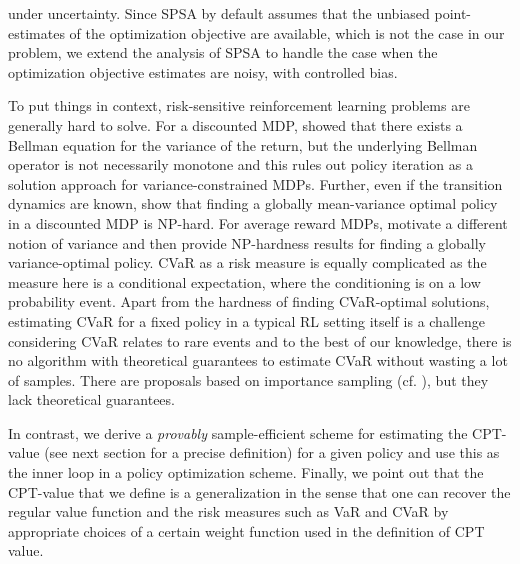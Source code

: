 under uncertainty.
Since SPSA by default assumes that the unbiased point-estimates of the optimization objective are available, which
is not the case in our problem, we extend the analysis of SPSA to handle the case when the optimization objective estimates are noisy, with controlled bias.
%
%

To put things in context, risk-sensitive reinforcement learning problems are generally hard to solve. 
For a discounted MDP, \cite{Sobel82VD} showed that there exists a Bellman equation for the variance of the return, but the underlying Bellman operator is not necessarily monotone and this rules out policy iteration as a solution approach for variance-constrained MDPs.
Further, even if the transition dynamics are known, \cite{mannor2013algorithmic} show that finding a globally mean-variance optimal policy in a discounted MDP is NP-hard.
For average reward MDPs, \cite{filar1989variance} motivate a different notion of variance and then provide NP-hardness results for finding a globally variance-optimal policy.
CVaR as a risk measure is equally complicated as the measure here is a conditional expectation, where the conditioning is on a low probability event. Apart from the hardness of finding CVaR-optimal solutions, estimating CVaR for a fixed policy in a typical RL setting itself is a challenge considering CVaR relates to rare events and to the best of our knowledge, there is no algorithm with theoretical guarantees to estimate CVaR without wasting a lot of samples. There are proposals based on importance sampling (cf. \cite{prashanth2014policy,tamar2014optimizing}), but they lack theoretical guarantees. 

In contrast, we derive a \textit{provably} sample-efficient scheme for estimating the CPT-value (see next section for a precise definition) for a given policy and use this as the inner loop in a policy optimization scheme. Finally, we point out that the CPT-value that we define is a generalization in the sense that one can recover the regular value function and the risk measures such as VaR and CVaR by appropriate choices of a certain weight function used in the definition of CPT value.

